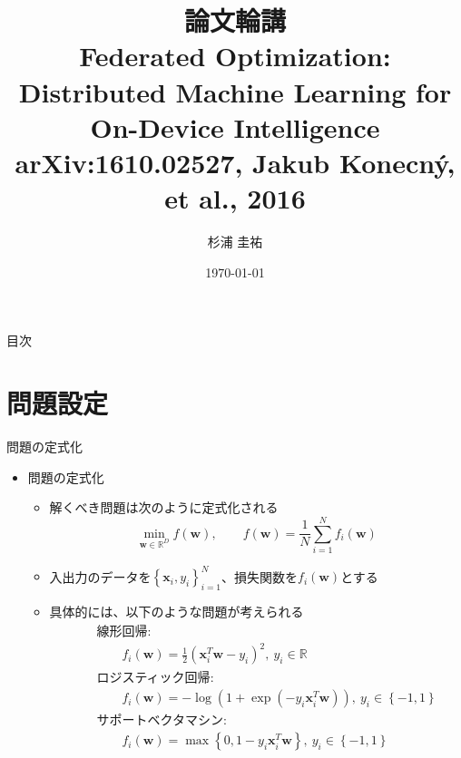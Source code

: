 \documentclass[dvipdfmx,notheorems,t]{beamer}
\title[論文輪講: Federated Optimization]{論文輪講 \\ Federated Optimization: \\ Distributed Machine Learning for On-Device Intelligence \\ \normalsize{arXiv:1610.02527, Jakub Konecn{\'{y}}, et al., 2016} }
\author{杉浦 圭祐}
\institute[松谷研究室]{慶應義塾大学理工学部情報工学科 松谷研究室}
\date{\today}
\begin{document}
\frame{\titlepage}

\section{}

\begin{frame}{目次}
\tableofcontents
\end{frame}

\section{問題設定}

\begin{frame}{問題の定式化}

\begin{itemize}
	\item 問題の定式化
	\begin{itemize}
		\item 解くべき問題は次のように定式化される
		\begin{equation}
			\min_{\bm{w} \in \mathbb{R}^D} f(\bm{w}), \qquad f(\bm{w}) = \frac{1}{N} \sum_{i = 1}^N f_i(\bm{w})
		\end{equation}
	
		\item 入出力のデータを$\left\{ \bm{x}_i, y_i \right\}_{i = 1}^N$、損失関数を$f_i(\bm{w})$とする
		\item 具体的には、以下のような問題が考えられる
		\begin{eqnarray}
			&& \text{線形回帰}: \nonumber \\
			&& \qquad f_i(\bm{w}) = \frac{1}{2} \left( \bm{x}_i^T \bm{w} - y_i \right)^2, \ y_i \in \mathbb{R} \\
			&& \text{ロジスティック回帰}: \nonumber \\
			&& \qquad f_i(\bm{w}) = - \log \left( 1 + \exp \left( - y_i \bm{x}_i^T \bm{w} \right) \right), \ y_i \in \left\{ -1, 1 \right\} \\
			&& \text{サポートベクタマシン}: \nonumber \\
			&& \qquad f_i(\bm{w}) = \max \left\{ 0, 1 - y_i \bm{x}_i^T \bm{w} \right\}, \ y_i \in \left\{ -1, 1 \right\}
		\end{eqnarray}
	\end{itemize}
\end{itemize}

\end{frame}
\end{document}
